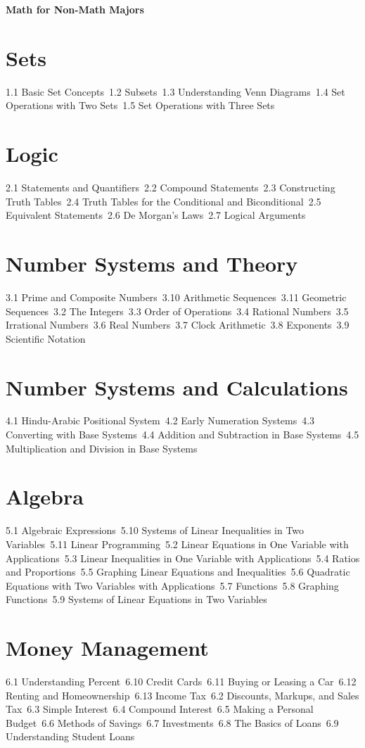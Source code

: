 {\LARGE \bf{Math for Non-Math Majors}}
\section{Sets}
1.1 Basic Set Concepts\
1.2 Subsets\
1.3 Understanding Venn Diagrams\
1.4 Set Operations with Two Sets\
1.5 Set Operations with Three Sets\
\section{Logic}
2.1 Statements and Quantifiers\
2.2 Compound Statements\
2.3 Constructing Truth Tables\
2.4 Truth Tables for the Conditional and Biconditional\
2.5 Equivalent Statements\
2.6 De Morgan’s Laws\
2.7 Logical Arguments\
\section{Number Systems and Theory}
3.1 Prime and Composite Numbers\
3.10 Arithmetic Sequences\
3.11 Geometric Sequences\
3.2 The Integers\
3.3 Order of Operations\
3.4 Rational Numbers\
3.5 Irrational Numbers\
3.6 Real Numbers\
3.7 Clock Arithmetic\
3.8 Exponents\
3.9 Scientific Notation\
\section{Number Systems and Calculations}
4.1 Hindu-Arabic Positional System\
4.2 Early Numeration Systems\
4.3 Converting with Base Systems\
4.4 Addition and Subtraction in Base Systems\
4.5 Multiplication and Division in Base Systems\
\section{Algebra}
5.1 Algebraic Expressions\
5.10 Systems of Linear Inequalities in Two Variables\
5.11 Linear Programming\
5.2 Linear Equations in One Variable with Applications\
5.3 Linear Inequalities in One Variable with Applications\
5.4 Ratios and Proportions\
5.5 Graphing Linear Equations and Inequalities\
5.6 Quadratic Equations with Two Variables with Applications\
5.7 Functions\
5.8 Graphing Functions\
5.9 Systems of Linear Equations in Two Variables\
\section{Money Management}
6.1 Understanding Percent\
6.10 Credit Cards\
6.11 Buying or Leasing a Car\
6.12 Renting and Homeownership\
6.13 Income Tax\
6.2 Discounts, Markups, and Sales Tax\
6.3 Simple Interest\
6.4 Compound Interest\
6.5 Making a Personal Budget\
6.6 Methods of Savings\
6.7 Investments\
6.8 The Basics of Loans\
6.9 Understanding Student Loans\
